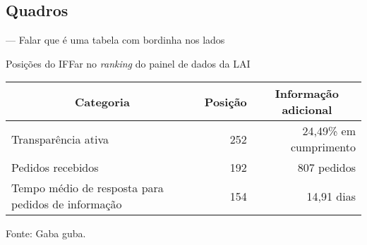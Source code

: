 \subsection{Quadros}
--- Falar que é uma tabela com bordinha nos lados
\begin{quadro}[H]
  \centering\singlespacing

  \caption{Posições do IFFar no \textit{ranking} do painel de dados da LAI}
  \label{quadro:cgu-iffar}
  \begin{tabularx}{12cm}
    {|X|r|r|} %
    \hline
    \multicolumn{1}{|c|}{\textbf{Categoria}}    &   
    \multicolumn{1}{c}{\textbf{Posição}}  & 
    \multicolumn{1}{|c|}{\textbf{Informação adicional}} \\
    \hline

    Transparência ativa &
    252\textordmasculine{} &
    24,49\% em cumprimento \\

    Pedidos recebidos &
    192\textordmasculine{} &
    807 pedidos \\

    Tempo médio de resposta para pedidos de informação       &   
    154\textordmasculine{} &
    14,91 dias \\
    \hline

  \end{tabularx}

\hspace{\fill}

\footnotesize

Fonte: Gaba guba.
\end{quadro}
